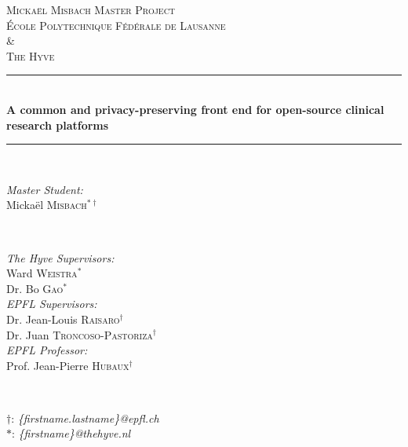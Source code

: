 \begin{titlepage}

\newcommand{\HRule}{\rule{\linewidth}{0.5mm}}
\center
 
\textsc{\LARGE Mickaël Misbach Master Project}\\[0.5cm]

\textsc{\Large École Polytechnique Fédérale de Lausanne}\\ 
\textsc{\Large \&}\\ 
\textsc{\Large The Hyve}\\[0.5cm] 

\HRule \\[0.4cm]
{ \huge \bfseries A common and privacy-preserving front end for open-source clinical research platforms}\\[0.4cm]
\HRule \\[1cm]
 
\begin{minipage}{0.4\textwidth}
\begin{flushleft} \large
\emph{Master Student:}\\
Mickaël \textsc{Misbach}$^{*\dagger}$\\
\end{flushleft}
\end{minipage}
~
\begin{minipage}{0.4\textwidth}
\begin{flushright} \large
\emph{The Hyve Supervisors:} \\
Ward \textsc{Weistra}$^*$\\
Dr. Bo \textsc{Gao}$^*$\\[\baselineskip]
\emph{EPFL Supervisors:} \\
Dr. Jean-Louis \textsc{Raisaro}$^\dagger$\\
Dr. Juan \textsc{Troncoso-Pastoriza}$^\dagger$\\[\baselineskip]
\emph{EPFL Professor:} \\
Prof. Jean-Pierre \textsc{Hubaux}$^\dagger$\\
\end{flushright}
\end{minipage}
~ \\[0.5cm]
\begin{minipage}{1\textwidth}
\begin{flushbottom}
\centering\small
$\dagger$: \emph{\{firstname.lastname\}@epfl.ch} \\
$*$: \emph{\{firstname\}@thehyve.nl} \\
\end{flushbottom}
\end{minipage}\\[2cm]



\end{titlepage}
